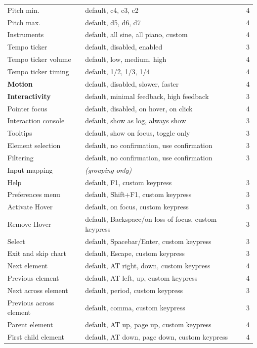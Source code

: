 \documentclass[12pt]{cmuthesis}
\begin{document}
{\begin{longtable}{@{}l p{7.2cm} r@{}}
\qquad Pitch min. & default, c4, c3, c2 & 4 \\
\qquad Pitch max. & default, d5, d6, d7 & 4 \\
\quad Instruments & default, all sine, all piano, custom & 4 \\
\quad Tempo ticker & default, disabled, enabled & 3 \\
\qquad Tempo ticker volume & default, low, medium, high & 4 \\
\qquad Tempo ticker timing & default, 1/2, 1/3, 1/4 & 4 \\
\addlinespace
\textbf{Motion} & default, disabled, slower, faster & 4 \\
\addlinespace
\textbf{Interactivity} & default, minimal feedback, high feedback & 3 \\
\quad Pointer focus & default, disabled, on hover, on click & 4 \\
\quad Interaction console & default, show as log, always show & 3 \\
\quad Tooltips & default, show on focus, toggle only & 3 \\
\quad Element selection & default, no confirmation, use confirmation & 3 \\
\quad Filtering & default, no confirmation, use confirmation & 3 \\
\quad Input mapping & \textit{(grouping only)} &  \\
\qquad Help & default, F1, custom keypress & 3 \\
\qquad Preferences menu & default, Shift+F1, custom keypress & 3 \\
\qquad Activate Hover & default, on focus, custom keypress & 3 \\
\qquad Remove Hover & default, Backspace/on loss of focus, custom keypress & 3 \\
\qquad Select & default, Spacebar/Enter, custom keypress & 3 \\
\qquad Exit and skip chart & default, Escape, custom keypress & 3 \\
\qquad Next element & default, AT right, down, custom keypress & 4 \\
\qquad Previous element & default, AT left, up, custom keypress & 4 \\
\qquad Next across element & default, period, custom keypress & 3 \\
\qquad Previous across element & default, comma, custom keypress & 3 \\
\qquad Parent element & default, AT up, page up, custom keypress & 4 \\
\qquad First child element & default, AT down, page down, custom keypress & 4 \\
\end{longtable}}
% 
\end{document}

